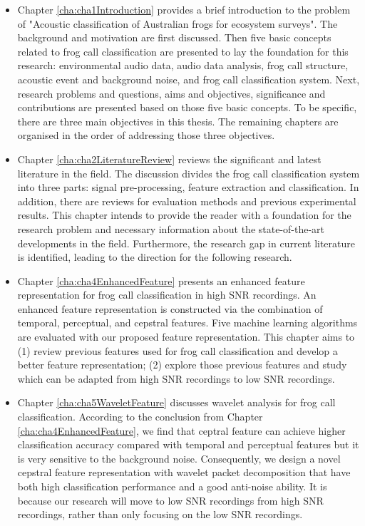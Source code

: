 \begin{itemize}
\item  Chapter \ref{cha:cha1Introduction} provides a brief introduction to the problem of "Acoustic classification of Australian frogs for ecosystem surveys". The background and motivation are first discussed. Then five basic concepts related to frog call classification are presented to lay the foundation for this research: environmental audio data, audio data analysis, frog call structure, acoustic event and background noise, and frog call classification system. Next, research problems and questions, aims and objectives, significance and contributions are presented based on those five basic concepts. To be specific, there are three main objectives in this thesis. The remaining chapters are organised in the order of addressing those three objectives.

\item Chapter \ref{cha:cha2LiteratureReview} reviews the significant and latest literature in the field. The discussion divides the frog call classification system into three parts: signal pre-processing, feature extraction and classification. In addition, there are reviews for evaluation methods and previous experimental results. This chapter intends to provide the reader with a foundation for the research problem and necessary information about the state-of-the-art developments in the field. Furthermore, the research gap in current literature is identified, leading to the direction for the following research.


\item Chapter \ref{cha:cha4EnhancedFeature} presents an enhanced feature representation for frog call classification in high SNR recordings. An enhanced feature representation is constructed via the combination of temporal, perceptual, and cepstral features. Five machine learning algorithms are evaluated with our proposed feature representation. This chapter aims to (1) review previous features used for frog call classification and develop a better feature representation; (2) explore those previous features and study which can be adapted from high SNR recordings to low SNR recordings.


\item  Chapter \ref{cha:cha5WaveletFeature} discusses wavelet analysis for frog call classification. According to the conclusion from Chapter \ref{cha:cha4EnhancedFeature}, we find that ceptral feature can achieve higher classification accuracy compared with temporal and perceptual features but it is very sensitive to the background noise. Consequently, we design a novel cepstral feature representation with wavelet packet decomposition that have both high classification performance and a good anti-noise ability. It is because our research will move to low SNR recordings from high SNR recordings, rather than only focusing on the low SNR recordings.



\end{itemize}

